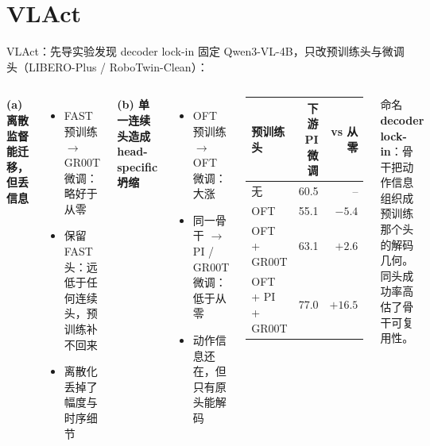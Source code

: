 \documentclass[aspectratio=169,10pt]{beamer}
\newcommand{\con}[1]{\textcolor{negative}{#1}}
\newcommand{\HL}[1]{\textcolor{emphasis}{#1}}
\begin{document}
\section{VLAct}
\begin{frame}{VLAct：先导实验发现 decoder lock-in}
  固定 Qwen3-VL-4B，只改预训练头与微调头（LIBERO-Plus / RoboTwin-Clean）：
  \vspace{4pt}
  \begin{columns}[T]
    \textbf{(a) 离散监督能迁移，但丢信息}
    \begin{itemize}
      \item FAST 预训练 $\to$ GR00T 微调：略好于从零
      \item 保留 FAST 头：远低于任何连续头，预训练补不回来
      \item 离散化丢掉了幅度与时序细节
    \end{itemize}
    \vspace{4pt}
    \textbf{(b) 单一连续头造成 head-specific 坍缩}
    \begin{itemize}
      \item OFT 预训练 $\to$ OFT 微调：大涨
      \item 同一骨干 $\to$ PI / GR00T 微调：\con{低于从零}
      \item 动作信息还在，但只有原头能解码
    \end{itemize}
    \begin{center}\small
    \begin{tabular}{lrr}
      \toprule
      预训练头 & 下游 PI 微调 & vs 从零 \\
      \midrule
      无 & 60.5 & – \\
      OFT & \con{55.1} & $-5.4$ \\
      OFT + GR00T & 63.1 & $+2.6$ \\
      OFT + PI + GR00T & \HL{77.0} & $+16.5$ \\
      \bottomrule
    \end{tabular}
    \end{center}
    \vspace{6pt}
    \begin{exampleblock}{命名}
      \textbf{decoder lock-in}：骨干把动作信息组织成预训练那个头的解码几何。同头成功率高估了骨干可复用性。
    \end{exampleblock}
  \end{columns}
\end{frame}
\end{document}
